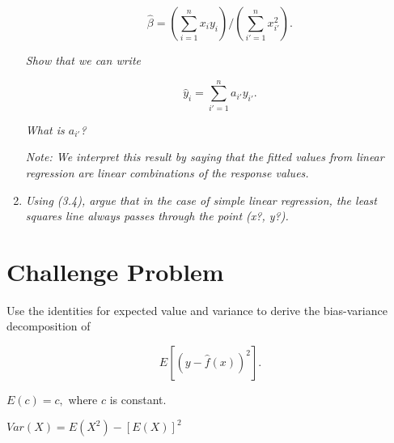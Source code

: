 \documentclass[11pt]{article}
\begin{document}
\begin{enumerate}
	$$ \hat{\beta} = \left(\sum_{i=1}^nx_iy_i\right) / \left(\sum_{i'=1}^nx_{i'}^2\right).$$
	
	
	\textit{Show that we can write}
	
	$$ \hat{y}_i = \sum_{i'=1}^na_{i'}y_{i'}.$$
	
	\textit{What is $a_{i'}$?}
	
	\textit{Note: We interpret this result by saying that the fitted values from linear regression are linear combinations of the response values.}
	
	\item \textit{Using (3.4), argue that in the case of simple linear regression, the
least squares line always passes through the point (x?, y?).
}
	
\end{enumerate}


\section*{Challenge Problem}
Use the identities for expected value and variance to derive the bias-variance decomposition of 

$$ E\left[ \left(y - \hat{f}(x) \right)^2 \right].$$

$E(c) = c,$ where $c$ is constant.

$Var(X) = E(X^2) - [E(X)]^2$ 
\end{document}
